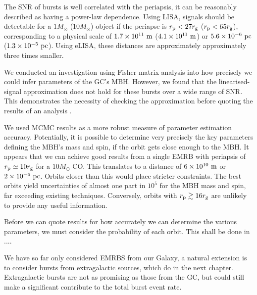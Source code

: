 The SNR of bursts is well correlated with the periapsis, it can be reasonably described as having a power-law dependence. Using LISA, signals should be detectable for a $1 M_\odot$ ($10 M_\odot$) object if the periapse is $r_\mathrm{p} < 27 r_\mathrm{g}$ ($r_\mathrm{p} < 65 r_\mathrm{g}$), corresponding to a physical scale of $1.7 \times 10^{11}~\mathrm{m}$ ($4.1 \times 10^{11}~\mathrm{m}$) or $5.6 \times 10^{-6}~\mathrm{pc}$ ($1.3 \times 10^{-5}~\mathrm{pc}$). Using eLISA, these distances are approximately approximately three times smaller.

We conducted an investigation using Fisher matrix analysis into how precisely we could infer parameters of the GC's MBH. However, we found that the linearised-signal approximation does not hold for these bursts over a wide range of SNR. This demonstrates the necessity of checking the approximation before quoting the results of an analysis \citep{Vallisneri2008}.

We used MCMC results as a more robust measure of parameter estimation accuracy. Potentially, it is possible to determine very precisely the key parameters defining the MBH's mass and spin, if the orbit gets close enough to the MBH. It appears that we can achieve good results from a single EMRB with periapsis of $r_\mathrm{p} \simeq 10 r_\mathrm{g}$ for a $10 M_\odot$ CO. This translates to a distance of $6 \times 10^{10}~\mathrm{m}$ or $2 \times 10^{-6}~\mathrm{pc}$. Orbits closer than this would place stricter constraints. The best orbits yield uncertainties of almost one part in $10^5$ for the MBH mass and spin, far exceeding existing techniques. Conversely, orbits with $r_\mathrm{p} \gtrsim 16 r_\mathrm{g}$ are unlikely to provide any useful information.

Before we can quote results for how accurately we can determine the various parameters, we must consider the probability of each orbit. This shall be done in ....

We have so far only considered EMRBS from our Galaxy, a natural extension is to consider bursts from extragalactic sources, which do in the next chapter. Extragalactic bursts are not as promising as those from the GC, but could still make a significant contribute to the total burst event rate. 